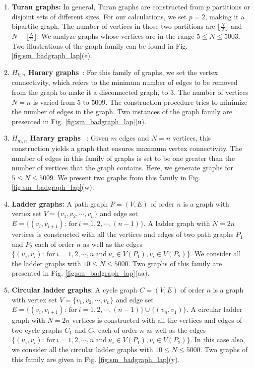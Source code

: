 \documentclass[%
 reprint,
 superscriptaddress,
 amsmath,amssymb,
 aps,
 pra,
floatfix,
nofootinbib,
]{revtex4-2}
\theoremstyle{definition}
\theoremstyle{remark}
\begin{document}
\begin{appendix}
\begin{enumerate}
		\item 
		\textbf{Turan graphs:} 
		In general, Turan graphs are constructed from $p$ partitions or disjoint sets of different sizes. For our calculations, we set $p=2$, making it a bipartite graph. The number of vertices in those two partitions are $\big\lfloor\frac{N}{2}\big\rfloor$ and $N - \big\lfloor\frac{N}{2}\big\rfloor$. We analyze graphs whose vertices are in the range $5 \leq N \leq 5003$. Two illustrations of the graph family can be found in Fig. \ref{fig:sm_badgraph_lap}(e). 
		
		\item 
		\textbf{$H_{k,n}$ Harary graphs}~\cite{harary1962maximum}: For this family of graphs, we set the vertex connectivity, which refers to the minimum number of edges to be removed from the graph to make it a disconnected graph, to $3$. The number of vertices $N=n$ is varied from $5$ to $5009$. The construction procedure tries to minimize the number of edges in the graph. Two instances of the graph family are presented in Fig. \ref{fig:sm_badgraph_lap}(u).
		
		\item 
		\textbf{$H_{m,n}$ Harary graphs}~\cite{harary1962maximum} : Given $m$ edges and $N=n$ vertices, this construction yields a graph that ensures maximum vertex connectivity. The number of edges in this family of graphs is set to be one greater than the number of vertices that the graph contains. Here, we generate graphs for $5 \leq N \leq 5009$. We present two graphs from this family in Fig. \ref{fig:sm_badgraph_lap}(w).
		
		\item 
		\textbf{Ladder graphs:} 
		A path graph $P = (V, E)$ of order $n$ is a graph with vertex set $V = \{v_1, v_2, \cdots, v_n\}$ and edge set $E = \{(v_i, v_{i + 1}): ~\text{for}~ i = 1, 2, \cdots, (n - 1)\}$. A ladder graph with $N = 2n$ vertices is constructed with all the vertices and edges of two path graphs $P_1$ and $P_2$ each of order $n$ as well as the edges $\{(u_i, v_i): ~\text{for}~ i = 1, 2, \cdots, n ~\text{and}~ u_i \in V(P_1), v_i \in V(P_2)\}$. We consider all the ladder graphs with $ 10 \leq N \leq 5000$. Two graphs of this family are presented in Fig. \ref{fig:sm_badgraph_lap}(aa).
		
		\item 
		\textbf{Circular ladder graphs}: 
		A cycle graph $C = (V, E)$ of order $n$ is a graph with vertex set $V = \{v_1, v_2, \cdots, v_n\}$ and edge set $E = \{(v_i, v_{i + 1}): ~\text{for}~ i = 1, 2, \cdots, (n - 1)\} \cup \{(v_n, v_1)\}$. A circular ladder graph with $N = 2n$ vertices is constructed with all the vertices and edges of two cycle graphs $C_1$ and $C_2$ each of order $n$ as well as the edges $\{(u_i, v_i): ~\text{for}~ i = 1, 2, \cdots, n ~\text{and}~ u_i \in V(P_1), v_i \in V(P_2)\}$. In this case also, we consider all the circular ladder graphs with $10 \leq N \leq 5000$. Two graphs of this family are given in Fig. \ref{fig:sm_badgraph_lap}(y).
		  

\end{enumerate}
\end{appendix}
\end{document}
